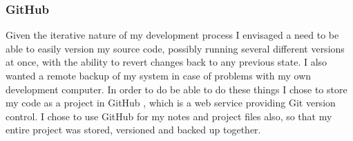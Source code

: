 \subsubsection{GitHub}

Given the iterative nature of my development process I envisaged a need to be able to easily version my source code, possibly running several different versions at once, with the ability to revert changes back to any previous state. I also wanted a remote backup of my system in case of problems with my own development computer. In order to do be able to do these things I chose to store my code as a project in GitHub \cite{GitHub}, which is a web service providing Git version control. I chose to use GitHub for my notes and project files also, so that my entire project was stored, versioned and backed up together.

